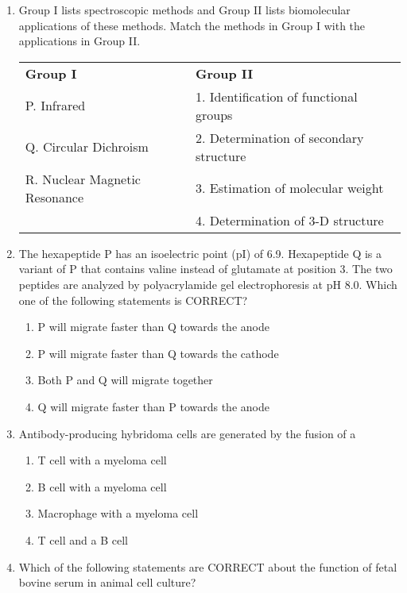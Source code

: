 \documentclass[12pt]{article}
\begin{document}
\begin{enumerate}[label=Q.\arabic*,start=26]
	\item Group I lists spectroscopic methods and Group II lists biomolecular applications of these methods. Match the methods in Group I with the applications in Group II.

		\begin{center}
			\begin{tabular}{ll}
				\textbf{Group I} & \textbf{Group II} \\
				P. Infrared & 1. Identification of functional groups \\
				Q. Circular Dichroism & 2. Determination of secondary structure \\
				R. Nuclear Magnetic Resonance & 3. Estimation of molecular weight \\
				& 4. Determination of 3-D structure \\
			\end{tabular}
		\end{center}
	\item The hexapeptide P has an isoelectric point (pI) of 6.9. Hexapeptide Q is a variant of P that contains valine instead of glutamate at position 3. The two peptides are analyzed by polyacrylamide gel electrophoresis at pH 8.0. Which one of the following statements is CORRECT?
		\begin{enumerate}[label=(\Alph*)]
			\item P will migrate faster than Q towards the anode
			\item P will migrate faster than Q towards the cathode
			\item Both P and Q will migrate together
			\item Q will migrate faster than P towards the anode
		\end{enumerate}

	\item Antibody-producing hybridoma cells are generated by the fusion of a
		\begin{enumerate}[label=(\Alph*)]
			\item T cell with a myeloma cell
			\item B cell with a myeloma cell
			\item Macrophage with a myeloma cell
			\item T cell and a B cell
		\end{enumerate}

	\item Which of the following statements are CORRECT about the function of fetal bovine serum in animal cell culture?


\end{enumerate}
\end{document}
